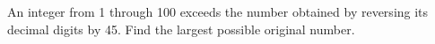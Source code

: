 An integer from 1 through 100 exceeds the number obtained by reversing its decimal digits by 45. Find the largest possible original number.
